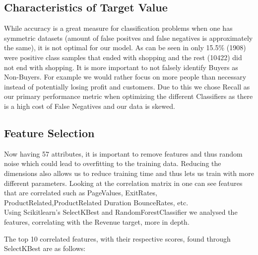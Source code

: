 \subsection{Characteristics of Target Value}
While accuracy is a great measure for classification problems when one has symmetric datasets (amount of false positves and false negatives is approximately the same), it is not optimal for our model.
As can be seen in  only 15.5\% (1908) were positive class samples that ended with shopping and the rest (10422) did not end with shopping. It is more important to not falsely identify Buyers as Non-Buyers. For example we would rather focus on more people than necessary instead of potentially losing profit and customers. Due to this we chose Recall as our primary performance metric when optimizing the different Classifiers as there is a high cost of False Negatives and our data is skewed.

\subsection{Feature Selection}
Now having 57 attributes, it is important to remove features and thus random noise which could lead to overfitting to the training data. Reducing the dimensions also allows us to reduce training time and thus lets us train with more different parameters. Looking at the correlation matrix in  one can see features that are correlated such as PageValues, ExitRates, ProductRelated,ProductRelated Duration BounceRates, etc.  
 \\
\newline
Using Scikitlearn's SelectKBest and RandomForestClassifier we analysed the features, correlating with the Revenue target, more in depth. \\
\newline

The top 10 correlated features, with their respective scores, found through SelectKBest are as follows:

